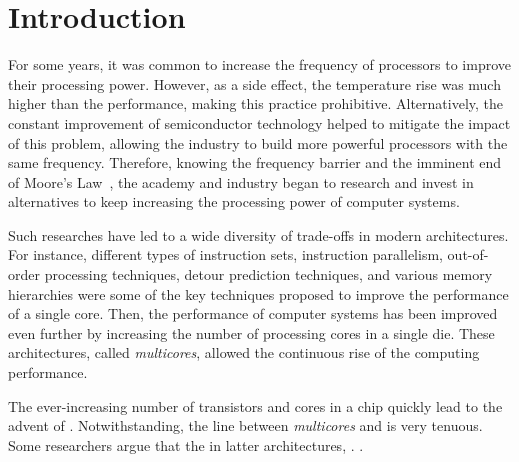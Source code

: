 \chapter{Introduction}
\label{ch.intro}

	For some years, it was common to increase the frequency of processors
	to improve their processing power.
	However, as a side effect, the temperature rise was much higher than the
	performance, making this practice prohibitive.
	Alternatively, the constant improvement of semiconductor technology helped
	to mitigate the impact of this problem, allowing the industry to build
	more powerful processors with the same frequency.
	Therefore, knowing the frequency barrier and the imminent end of Moore's Law~\cite{moore:1965},
	the academy and industry began to research and invest in alternatives
	to keep increasing the processing power of computer systems.

	Such researches have led to a wide diversity of trade-offs in modern architectures.
	For instance, different types of instruction sets, instruction parallelism,
	out-of-order processing techniques, detour prediction techniques, and various
	memory hierarchies were some of the key techniques proposed to improve the
	performance of a single core.
	Then, the performance of computer systems has been improved even further by
	increasing the number of processing cores in a single die.
	These architectures, called \textit{multicores}, allowed the continuous
	rise of the computing performance.

	The ever-increasing number of transistors and cores in a chip quickly lead
	to the advent of \manycores.
	Notwithstanding, the line between \textit{multicores} and \manycores is very tenuous.
	Some researchers argue that the in latter architectures, .
	.

